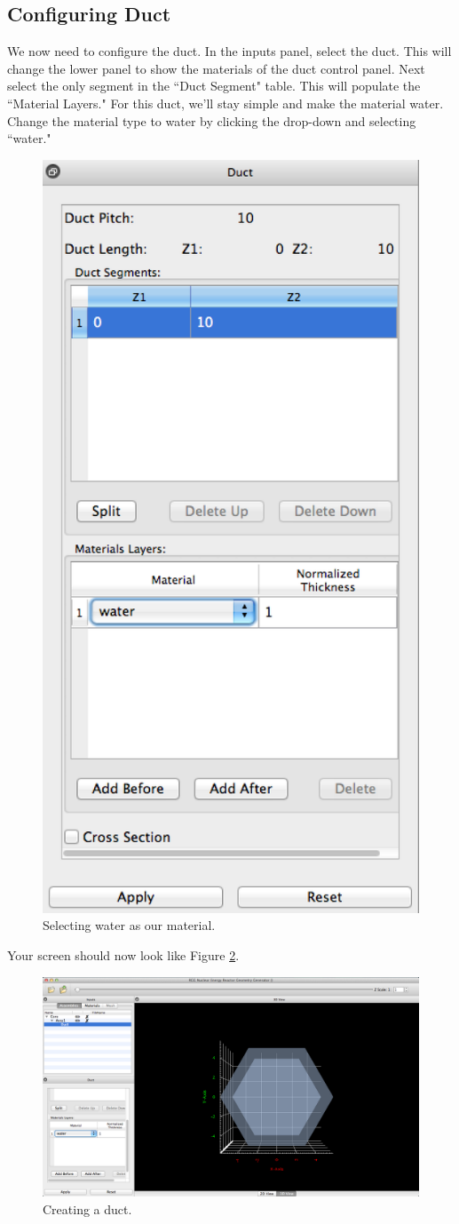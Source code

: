 \subsection{Configuring Duct}

We now need to configure the duct.  In the inputs panel, select the duct.   This will change the lower panel to show the materials of the duct control panel.  Next select the only segment in the ``Duct Segment" table.  This will populate the ``Material Layers."   For this duct, we'll stay simple and make the material water.  Change the material type to water by clicking the drop-down and selecting ``water."

\begin{figure}[H]
	\begin{center}
		\includegraphics[width=0.5\linewidth]{Images/hex-set-duct-material.png}
		\caption{Selecting water as our material.}
		\label{fig:Hex7}
	\end{center}
\end{figure}

Your screen should now look like Figure \ref{fig:Hex8}.

\begin{figure}[H]
	\begin{center}
		\includegraphics[width=0.5\linewidth]{Images/hex-duct-result.png}
		\caption{Creating a duct.}
		\label{fig:Hex8}
	\end{center}
\end{figure}

